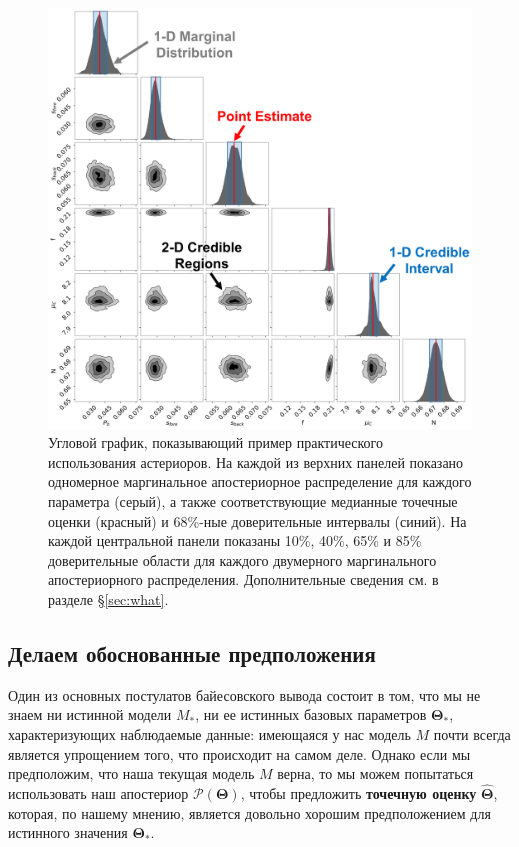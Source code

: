 \documentclass[12pt, titlepage]{article}
\newcommand{\params}{\ensuremath{\boldsymbol\Theta}}
\newcommand{\posterior}{\ensuremath{\mathcal{P}}}
\begin{document}
\begin{figure}
\begin{center}
\includegraphics[width=\textwidth]{figures/fig2_v2.png}
\end{center}
\caption{Угловой график, показывающий пример практического использования астериоров. На каждой из верхних панелей показано одномерное маргинальное апостериорное распределение для каждого параметра (серый), а также соответствующие медианные точечные оценки (красный) и 68\%-ные доверительные интервалы (синий). На каждой центральной панели показаны 10\%, 40\%, 65\% и 85\% доверительные области для каждого двумерного маргинального апостериорного распределения. Дополнительные сведения см. в разделе \S\ref{sec:what}.
}\label{fig:corner}
\end{figure}

\subsection{Делаем обоснованные предположения} \label{subsec:guess}

Один из основных постулатов байесовского вывода состоит в том, что мы не знаем ни истинной модели $M_*$, ни ее истинных базовых параметров $\params_*$, характеризующих наблюдаемые данные: имеющаяся у нас модель $M$ почти всегда является упрощением того, что происходит на самом деле. Однако если мы предположим, что наша текущая модель $M$ верна, то мы можем попытаться использовать наш апостериор $\posterior(\params)$, чтобы предложить \textbf{точечную оценку} $\hat{\params}$, которая, по нашему мнению, является довольно хорошим предположением для истинного значения $\params_*$.
\end{document}
